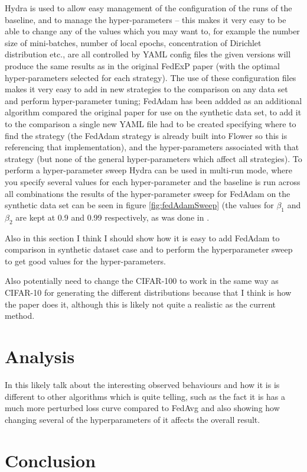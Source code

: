 \documentclass{article}
\begin{document}
Hydra is used to allow easy management of the configuration of the runs of the baseline, and to manage the hyper-parameters -- this makes it very easy to be able to change any of the values which you may want to, for example the number size of mini-batches, number of local epochs, concentration of Dirichlet distribution etc., are all controlled by YAML config files the given versions will produce the same results as in the original FedExP paper (with the optimal hyper-parameters selected for each strategy).  The use of these configuration files makes it very easy to add in new strategies to the comparison on any data set and perform hyper-parameter tuning; FedAdam has been addded as an additional algorithm compared the original paper for use on the synthetic data set, to add it to the comparison a single new YAML file had to be created specifying where to find the strategy (the FedAdam strategy is already built into Flower so this is referencing that implementation), and the hyper-parameters associated with that strategy (but none of the general hyper-parameters which affect all strategies).  To perform a hyper-parameter sweep Hydra can be used in multi-run mode, where you specify several values for each hyper-parameter and the baseline is run across all combinations the results of the hyper-parameter sweep for FedAdam on the synthetic data set can be seen in figure \ref{fig:fedAdamSweep} (the values for $\beta_1$ and $\beta_2$ are kept at 0.9 and 0.99 respectively, as was done in \cite{AdaptiveFederatedOptimisation}.

Also in this section I think I should show how it is easy to add FedAdam to comparison in synthetic dataset case and to perform the hyperparameter sweep to get good values for the hyper-parameters.


Also potentially need to change the CIFAR-100 to work in the same way as CIFAR-10 for generating the different distributions because that I think is how the paper does it, although this is likely not quite a realistic as the current method.


\section{Analysis}

In this likely talk about the interesting observed behaviours and how it is is different to other algorithms which is quite telling, such as the fact it is has a much more perturbed loss curve compared to FedAvg and also showing how changing several of the hyperparameters of it affects the overall result.

\section{Conclusion}


\end{document}

